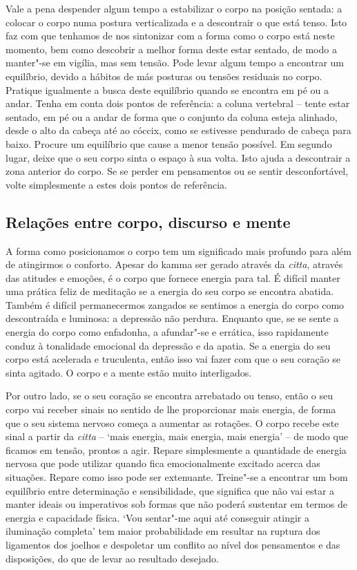 \enlargethispage{\baselineskip}

Vale a pena despender algum tempo a estabilizar o corpo na posição sentada: a
colocar o corpo numa postura verticalizada e a descontrair o que está tenso.
Isto faz com que tenhamos de nos sintonizar com a forma como o corpo está neste
momento, bem como descobrir a melhor forma deste estar sentado, de modo a
manter"-se em vigília, mas sem tensão. Pode levar algum tempo a encontrar um
equilíbrio, devido a hábitos de más posturas ou tensões residuais no corpo.
Pratique igualmente a busca deste equilíbrio quando se encontra em pé ou a
andar. Tenha em conta dois pontos de referência: a coluna vertebral -- tente
estar sentado, em pé ou a andar de forma que o conjunto da coluna esteja
alinhado, desde o alto da cabeça até ao cóccix, como se estivesse pendurado de
cabeça para baixo. Procure um equilíbrio que cause a menor tensão possível. Em
segundo lugar, deixe que o seu corpo sinta o espaço à sua volta. Isto ajuda a
descontrair a zona anterior do corpo. Se se perder em pensamentos ou se sentir
desconfortável, volte simplesmente a estes dois pontos de referência.

\subsection{Relações entre corpo, discurso e mente}

\enlargethispage{\baselineskip}

A forma como posicionamos o corpo tem um significado mais profundo para além de
atingirmos o conforto. Apesar do kamma ser gerado através da \emph{citta},
através das atitudes e emoções, é o corpo que fornece energia para tal. É
difícil manter uma prática feliz de meditação se a energia do seu corpo se
encontra abatida. Também é difícil permanecermos zangados se sentimos a energia
do corpo como descontraída e luminosa: a depressão não perdura. Enquanto que, se
se sente a energia do corpo como enfadonha, a afundar"-se e errática, isso
rapidamente conduz à tonalidade emocional da depressão e da apatia. Se a energia
do seu corpo está acelerada e truculenta, então isso vai fazer com que o seu
coração se sinta agitado. O corpo e a mente estão muito interligados.

Por outro lado, se o seu coração se encontra arrebatado ou tenso, então o seu
corpo vai receber sinais no sentido de lhe proporcionar mais energia, de forma
que o seu sistema nervoso começa a aumentar as rotações. O corpo recebe este
sinal a partir da \emph{citta} -- `mais energia, mais energia, mais energia' --
de modo que ficamos em tensão, prontos a agir. Repare simplesmente a quantidade
de energia nervosa que pode utilizar quando fica emocionalmente excitado acerca
das situações. Repare como isso pode ser extenuante. Treine"-se a encontrar um
bom equilíbrio entre determinação e sensibilidade, que significa que não vai
estar a manter ideais ou imperativos sob formas que não poderá sustentar em
termos de energia e capacidade física. `Vou sentar"-me aqui até conseguir atingir
a iluminação completa' tem maior probabilidade em resultar na ruptura dos
ligamentos dos joelhos e despoletar um conflito ao nível dos pensamentos e das
disposições, do que de levar ao resultado desejado.

